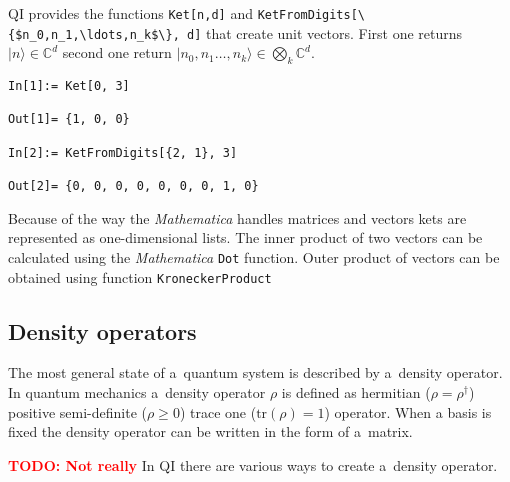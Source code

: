 \documentclass[a4paper,11pt]{elsart}
\newcommand{\ket}[1]{\ensuremath{|#1\rangle}}
\newcommand{\Mathematica}{\emph{Mathematica}}
\newcommand{\1}{{\rm 1\hspace{-0.9mm}l}}
\newcommand{\tr}{\mathrm{tr}}
\newcommand{\qi}{QI}
\newcommand{\Cplx}{\ensuremath{\mathbb{C}}}
\newcommand{\todo}[1]{\textcolor{red}{\bf TODO: #1}}
\begin{document}
\qi{} provides the functions \lstinline!Ket[n,d]! and
\lstinline!KetFromDigits[\{$n_0,n_1,\ldots,n_k$\}, d]! that 
create unit vectors. First one returns $\ket{n}\in\Cplx^d$ second one return 
$\ket{n_0,n_1\ldots,n_k}\in\bigotimes_k\Cplx^d$.
\begin{lstlisting}
In[1]:= Ket[0, 3]

Out[1]= {1, 0, 0}

In[2]:= KetFromDigits[{2, 1}, 3]

Out[2]= {0, 0, 0, 0, 0, 0, 0, 1, 0}
\end{lstlisting}
Because of the way the \Mathematica{} handles matrices and vectors kets are 
represented as one-dimensional lists. The inner product of two vectors can be 
calculated using the \Mathematica{} \lstinline!Dot! function. Outer product of 
vectors can be obtained using function \lstinline!KroneckerProduct!

\subsection{Density operators}
The most general state of a~quantum system is described by a~density operator.
In quantum mechanics a~density operator $\rho$ is defined as hermitian
($\rho=\rho^\dagger$) positive semi-definite ($\rho\geq 0$) trace one
($\tr{(\rho)}=1$) operator. When a basis is fixed the density operator can be
written in the form of a~matrix. 

\todo{Not really}
In \qi{} there are various ways to create a~density operator.
\end{document}
